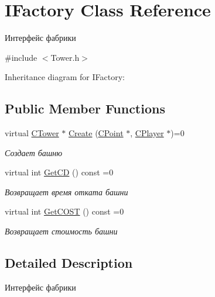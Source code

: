 \hypertarget{classIFactory}{}\section{I\+Factory Class Reference}
\label{classIFactory}


Интерфейс фабрики  




{\ttfamily \#include $<$Tower.\+h$>$}



Inheritance diagram for I\+Factory\+:
\subsection*{Public Member Functions}
\begin{DoxyCompactItemize}
\item 
virtual \hyperlink{classCTower}{C\+Tower} $\ast$ \hyperlink{classIFactory_a8d9bec1f0a8e76f379c40240296be71c}{Create} (\hyperlink{classCPoint}{C\+Point} $\ast$, \hyperlink{classCPlayer}{C\+Player} $\ast$)=0
\begin{DoxyCompactList}\small\item\em Создает башню \end{DoxyCompactList}\item 
virtual int \hyperlink{classIFactory_a466de46fb03411e2d6fa24f47b2b449f}{Get\+CD} () const =0\hypertarget{classIFactory_a466de46fb03411e2d6fa24f47b2b449f}{}\label{classIFactory_a466de46fb03411e2d6fa24f47b2b449f}

\begin{DoxyCompactList}\small\item\em Возвращает время отката башни \end{DoxyCompactList}\item 
virtual int \hyperlink{classIFactory_a44d7b0fb14b02463cf37aeb3499780b5}{Get\+C\+O\+ST} () const =0\hypertarget{classIFactory_a44d7b0fb14b02463cf37aeb3499780b5}{}\label{classIFactory_a44d7b0fb14b02463cf37aeb3499780b5}

\begin{DoxyCompactList}\small\item\em Возвращает стоимость башни \end{DoxyCompactList}\end{DoxyCompactItemize}


\subsection{Detailed Description}
Интерфейс фабрики 

